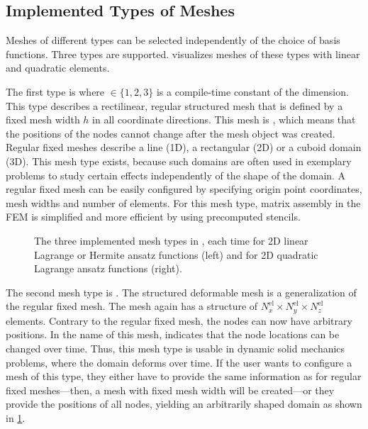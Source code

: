 \subsection{Implemented Types of Meshes}
Meshes of different types can be selected independently of the choice of basis functions. Three types are supported.  visualizes meshes of these types with linear and quadratic elements.

The first type is  where  $\in \{1,2,3\}$ is a compile-time constant of the dimension. This type describes a rectilinear, regular structured mesh that is defined by a fixed mesh width $h$ in all coordinate directions. This mesh is , which means that the positions of the nodes cannot change after the mesh object was created. 
Regular fixed meshes describe a line (1D), a rectangular (2D) or a cuboid domain (3D). This mesh type exists, because such domains are often used in exemplary problems to study certain effects independently of the shape of the domain. A regular fixed mesh can be easily configured by specifying origin point coordinates, mesh widths and number of elements. For this mesh type, matrix assembly in the FEM is simplified and more efficient by using precomputed stencils.

\begin{figure}%
  \centering%
  \def\svgwidth{0.5\textwidth}
  \caption{The three implemented mesh types in \opendihu{}, each time for 2D linear Lagrange or Hermite ansatz functions (left) and for 2D quadratic Lagrange ansatz functions (right).}%
  \label{fig:meshe_types}%
\end{figure}%

The second mesh type is . The structured deformable mesh is a generalization of the regular fixed mesh. The mesh again has a structure of $N^\text{el}_x \times N^\text{el}_y \times N^\text{el}_z$ elements. Contrary to the regular fixed mesh, the nodes can now have arbitrary positions. In the name of this mesh,  indicates that the node locations can be changed over time. Thus, this mesh type is usable in dynamic solid mechanics problems, where the domain deforms over time. If the user wants to configure a mesh of this type, they either have to provide the same information as for regular fixed meshes---then, a mesh with fixed mesh width will be created---or they provide the positions of all nodes, yielding an arbitrarily shaped domain as shown in \cref{fig:meshe_types}.

